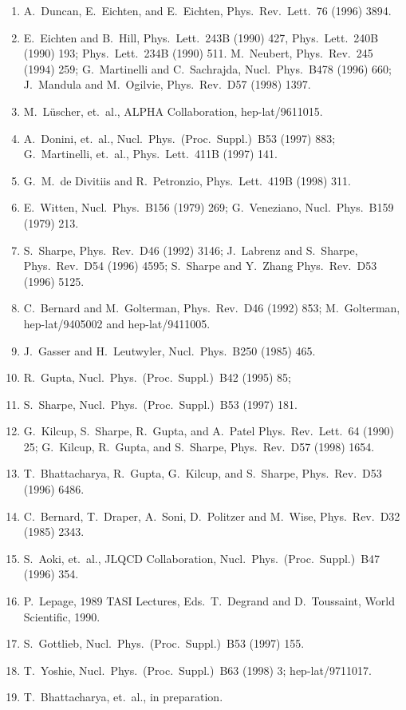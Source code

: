 \begin{enumerate}
\item A.~Duncan, E.~Eichten, and E.~Eichten, Phys.\ Rev.\ Lett.\ 76 (1996) 3894.
\item E.~Eichten and B.~Hill, Phys.\ Lett.\ 243B (1990) 427, Phys.\ Lett.\ 240B (1990) 193; Phys.\ Lett.\ 234B (1990) 511. M.~Neubert, Phys.\ Rev.\ 245 (1994) 259; G.~Martinelli and C.~Sachrajda, Nucl.\ Phys.\ B478 (1996) 660; J.~Mandula and M.~Ogilvie, Phys.\ Rev.\ D57 (1998) 1397.
\item M.~L\"uscher, et.\ al., ALPHA Collaboration, hep-lat/9611015.
\item A.~Donini, et.\ al., Nucl.\ Phys.\ (Proc.\ Suppl.)\ B53 (1997) 883; G.~Martinelli, et.\ al., Phys.\ Lett.\ 411B (1997) 141.
\item G.~M.~de Divitiis and R.~Petronzio, Phys.\ Lett.\ 419B (1998) 311.
\item E.~Witten, Nucl.\ Phys.\ B156 (1979) 269; G.~Veneziano, Nucl.\ Phys.\ B159 (1979) 213.
\item S.~Sharpe, Phys.\ Rev.\ D46 (1992) 3146; J.~Labrenz and S.~Sharpe, Phys.\ Rev.\ D54 (1996) 4595; S.~Sharpe and Y.~Zhang Phys.\ Rev.\ D53 (1996) 5125.
\item C.~Bernard and M.~Golterman, Phys.\ Rev.\ D46 (1992) 853; M.~Golterman, hep-lat/9405002 and hep-lat/9411005.
\item J.~Gasser and H.~Leutwyler, Nucl.\ Phys.\ B250 (1985) 465.
\item R.~Gupta, Nucl.\ Phys.\ (Proc.\ Suppl.)\ B42 (1995) 85;
\item S.~Sharpe, Nucl.\ Phys.\ (Proc.\ Suppl.)\ B53 (1997) 181.
\item G.~Kilcup, S.~Sharpe, R.~Gupta, and A.~Patel Phys.\ Rev.\ Lett.\ 64 (1990) 25; G.~Kilcup, R.~Gupta, and S.~Sharpe, Phys.\ Rev.\ D57 (1998) 1654.
\item T.~Bhattacharya, R.~Gupta, G.~Kilcup, and S.~Sharpe, Phys.\ Rev.\ D53 (1996) 6486.
\item C.~Bernard, T.~Draper, A.~Soni, D.~Politzer and M.~Wise, Phys.\ Rev.\ D32 (1985) 2343.
\item S.~Aoki, et.\ al., JLQCD Collaboration, Nucl.\ Phys.\ (Proc.\ Suppl.)\ B47 (1996) 354.
\item P.~Lepage, 1989 TASI Lectures, Eds.~T.~Degrand and D.~Toussaint, World Scientific, 1990.
\item S.~Gottlieb, Nucl.\ Phys.\ (Proc.\ Suppl.)\ B53 (1997) 155.
\item T.~Yoshie, Nucl.\ Phys.\ (Proc.\ Suppl.)\ B63 (1998) 3; hep-lat/9711017.
\item T.~Bhattacharya, et.\ al., in preparation.

\end{enumerate}
